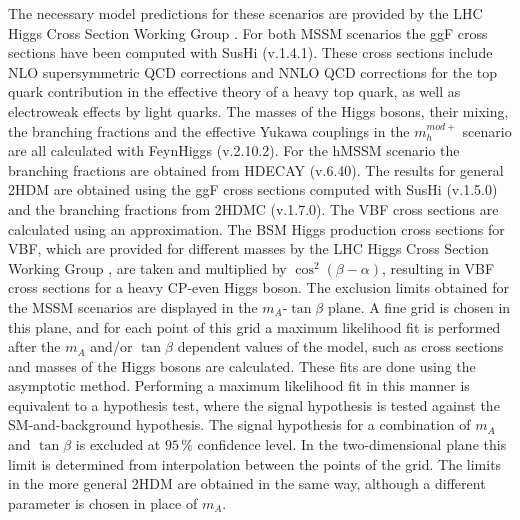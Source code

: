 The necessary model predictions for these scenarios are provided by the LHC Higgs Cross Section Working Group \cite{bsmhiggsxsecs}. For both MSSM scenarios the ggF cross sections have been computed with SusHi (v.1.4.1)\cite{Harlander:2012pb}. These cross sections include NLO supersymmetric QCD corrections and NNLO QCD corrections for the top quark contribution in the effective theory of a heavy top quark, as well as electroweak effects by light quarks. The masses of the Higgs bosons, their mixing, the branching fractions and the effective Yukawa couplings in the $m_{h}^{mod+}$ scenario are all calculated with FeynHiggs (v.2.10.2)\cite{Heinemeyer:1998yj, Heinemeyer:1998np, Degrassi:2002fi, Frank:2006yh, Hahn:2013ria}. For the hMSSM scenario the branching fractions are obtained from HDECAY (v.6.40)\cite{Djouadi:1997yw, Djouadi:2006bz}. The results for general 2HDM are obtained using the ggF cross sections computed with SusHi (v.1.5.0) and the branching fractions from 2HDMC (v.1.7.0)\cite{Rathsman:2011yv}. The VBF cross sections are calculated using an approximation. The BSM Higgs production cross sections for VBF, which are provided for different masses by the LHC Higgs Cross Section Working Group \cite{bsmhiggsxsecs2}, are taken and multiplied by $\cos^{2}(\beta-\alpha)$, resulting in VBF cross sections for a heavy CP-even Higgs boson.\newline
The exclusion limits obtained for the MSSM scenarios are displayed in the $m_{A}$-$\tan\beta$ plane. A fine grid is chosen in this plane, and for each point of this grid a maximum likelihood fit is performed after the $m_{A}$ and/or $\tan\beta$ dependent values of the model, such as cross sections and masses of the Higgs bosons are calculated. These fits are done using the asymptotic method. Performing a maximum likelihood fit in this manner is equivalent to a hypothesis test, where the signal hypothesis is tested against the SM-and-background hypothesis. The signal hypothesis for a combination of $m_{A}$ and $\tan\beta$ is excluded at $95\,\%$ confidence level. In the two-dimensional plane this limit is determined from interpolation between the points of the grid. The limits in the more general 2HDM are obtained in the same way, although a different parameter is chosen in place of $m_{A}$.


